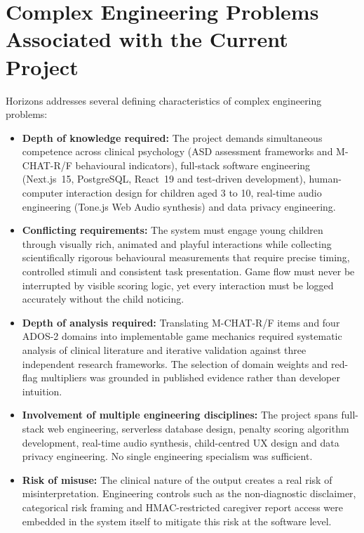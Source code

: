 \documentclass[12pt,a4paper,oneside]{report}
\begin{document}
\section{Complex Engineering Problems Associated with the Current Project}

Horizons addresses several defining characteristics of complex engineering problems:

\begin{itemize}[leftmargin=0.5in]
  \item \textbf{Depth of knowledge required:} The project demands simultaneous competence across clinical psychology (ASD assessment frameworks and M-CHAT-R/F behavioural indicators), full-stack software engineering (Next.js~15, PostgreSQL, React~19 and test-driven development), human-computer interaction design for children aged 3 to 10, real-time audio engineering (Tone.js Web Audio synthesis) and data privacy engineering.

  \item \textbf{Conflicting requirements:} The system must engage young children through visually rich, animated and playful interactions while collecting scientifically rigorous behavioural measurements that require precise timing, controlled stimuli and consistent task presentation. Game flow must never be interrupted by visible scoring logic, yet every interaction must be logged accurately without the child noticing.

  \item \textbf{Depth of analysis required:} Translating M-CHAT-R/F items and four ADOS-2 domains into implementable game mechanics required systematic analysis of clinical literature and iterative validation against three independent research frameworks. The selection of domain weights and red-flag multipliers was grounded in published evidence rather than developer intuition.

  \item \textbf{Involvement of multiple engineering disciplines:} The project spans full-stack web engineering, serverless database design, penalty scoring algorithm development, real-time audio synthesis, child-centred UX design and data privacy engineering. No single engineering specialism was sufficient.

  \item \textbf{Risk of misuse:} The clinical nature of the output creates a real risk of misinterpretation. Engineering controls such as the non-diagnostic disclaimer, categorical risk framing and HMAC-restricted caregiver report access were embedded in the system itself to mitigate this risk at the software level.
\end{itemize}
\end{document}
